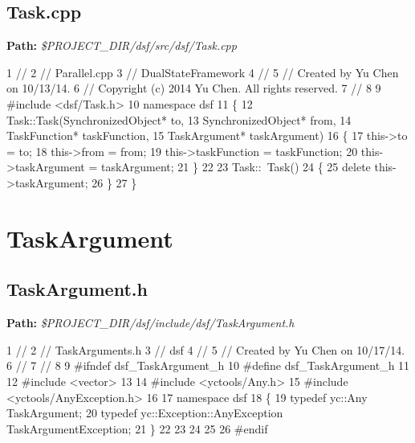  \hypertarget{_dual_state_framework_DualStateFrameworkTask_cpp}{}\subsection{Task.\+cpp}\label{_dual_state_framework_DualStateFrameworkTask_cpp}
{\bfseries Path\+:} {\itshape \$\+P\+R\+O\+J\+E\+C\+T\+\_\+\+D\+I\+R/dsf/src/dsf/\+Task.cpp} 
\begin{DoxyCodeInclude}
1 \textcolor{comment}{//}
2 \textcolor{comment}{//  Parallel.cpp}
3 \textcolor{comment}{//  DualStateFramework}
4 \textcolor{comment}{//}
5 \textcolor{comment}{//  Created by Yu Chen on 10/13/14.}
6 \textcolor{comment}{//  Copyright (c) 2014 Yu Chen. All rights reserved.}
7 \textcolor{comment}{//}
8 
9 \textcolor{preprocessor}{#include <dsf/Task.h>}
10 \textcolor{keyword}{namespace }dsf
11 \{
12     Task::Task(SynchronizedObject* to,
13                SynchronizedObject* from,
14                TaskFunction* taskFunction,
15                TaskArgument* taskArgument)
16     \{
17         this->to = to;
18         this->from = from;
19         this->taskFunction = taskFunction;
20         this->taskArgument = taskArgument;
21     \}
22     
23     Task::~Task()
24     \{
25         \textcolor{keyword}{delete} this->taskArgument;
26     \}
27 \}
\end{DoxyCodeInclude}
 \hypertarget{_dual_state_framework_DualStateFrameworkTaskArgument}{}\section{Task\+Argument}\label{_dual_state_framework_DualStateFrameworkTaskArgument}
\hypertarget{_dual_state_framework_DualStateFrameworkTaskArgument_h}{}\subsection{Task\+Argument.\+h}\label{_dual_state_framework_DualStateFrameworkTaskArgument_h}
{\bfseries Path\+:} {\itshape \$\+P\+R\+O\+J\+E\+C\+T\+\_\+\+D\+I\+R/dsf/include/dsf/\+Task\+Argument.h} 
\begin{DoxyCodeInclude}
1 \textcolor{comment}{//}
2 \textcolor{comment}{//  TaskArguments.h}
3 \textcolor{comment}{//  dsf}
4 \textcolor{comment}{//}
5 \textcolor{comment}{//  Created by Yu Chen on 10/17/14.}
6 \textcolor{comment}{//}
7 \textcolor{comment}{//}
8 
9 \textcolor{preprocessor}{#ifndef dsf\_TaskArgument\_h}
10 \textcolor{preprocessor}{#define dsf\_TaskArgument\_h}
11 
12 \textcolor{preprocessor}{#include <vector>}
13 
14 \textcolor{preprocessor}{#include <yctools/Any.h>}
15 \textcolor{preprocessor}{#include <yctools/AnyException.h>}
16 
17 \textcolor{keyword}{namespace }dsf
18 \{
19     \textcolor{keyword}{typedef} yc::Any TaskArgument;
20     \textcolor{keyword}{typedef} yc::Exception::AnyException TaskArgumentException;
21 \}
22 
23 
24 
25 
26 \textcolor{preprocessor}{#endif}
\end{DoxyCodeInclude}
